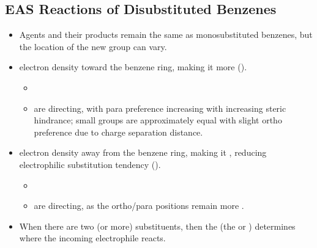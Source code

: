 \begin{itemize}
  \subsection{EAS Reactions of Disubstituted Benzenes}\label{EAS reactions of Disubstituted Benzenes}
  \begin{itemize}
      \item Agents and their products remain the same as monosubstituted benzenes, but the location of the new group can vary.
      \item {} electron density toward the benzene ring, making it more  ().
        \begin{itemize}
          \item {}
          \item {} are  directing, with para preference increasing with increasing steric hindrance; small groups are approximately equal with slight ortho preference due to charge separation distance.
        \end{itemize}
      \item {} electron density away from the benzene ring, making it , reducing electrophilic substitution tendency ().
        \begin{itemize}
          \item {}
          \item {} are  directing, as the ortho/para positions remain more .  
        \end{itemize}
      \item When there are two (or more) substituents, then the  (the  or ) determines where the incoming electrophile reacts.
  \end{itemize}
  

\end{itemize}
